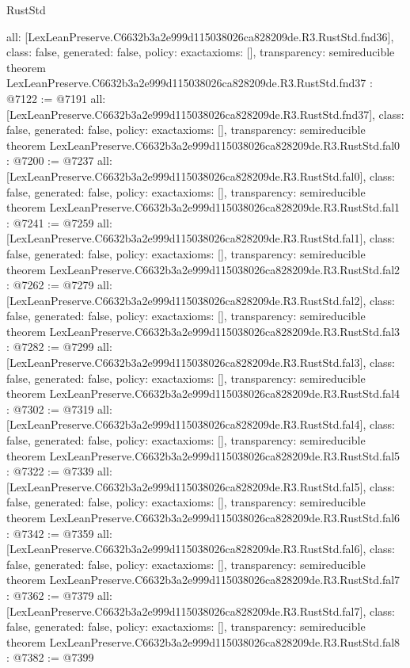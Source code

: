 \begin{lexlean}{RustStd}
\begin{coremodule}
{  all: [LexLeanPreserve.C6632b3a2e999d115038026ca828209de.R3.RustStd.fnd36],
  class: false,
  generated: false,
  policy: exact{axioms: []},
  transparency: semireducible
}
theorem LexLeanPreserve.C6632b3a2e999d115038026ca828209de.R3.RustStd.fnd37 : @7122 := @7191 {
  all: [LexLeanPreserve.C6632b3a2e999d115038026ca828209de.R3.RustStd.fnd37],
  class: false,
  generated: false,
  policy: exact{axioms: []},
  transparency: semireducible
}
theorem LexLeanPreserve.C6632b3a2e999d115038026ca828209de.R3.RustStd.fal0 : @7200 := @7237 {
  all: [LexLeanPreserve.C6632b3a2e999d115038026ca828209de.R3.RustStd.fal0],
  class: false,
  generated: false,
  policy: exact{axioms: []},
  transparency: semireducible
}
theorem LexLeanPreserve.C6632b3a2e999d115038026ca828209de.R3.RustStd.fal1 : @7241 := @7259 {
  all: [LexLeanPreserve.C6632b3a2e999d115038026ca828209de.R3.RustStd.fal1],
  class: false,
  generated: false,
  policy: exact{axioms: []},
  transparency: semireducible
}
theorem LexLeanPreserve.C6632b3a2e999d115038026ca828209de.R3.RustStd.fal2 : @7262 := @7279 {
  all: [LexLeanPreserve.C6632b3a2e999d115038026ca828209de.R3.RustStd.fal2],
  class: false,
  generated: false,
  policy: exact{axioms: []},
  transparency: semireducible
}
theorem LexLeanPreserve.C6632b3a2e999d115038026ca828209de.R3.RustStd.fal3 : @7282 := @7299 {
  all: [LexLeanPreserve.C6632b3a2e999d115038026ca828209de.R3.RustStd.fal3],
  class: false,
  generated: false,
  policy: exact{axioms: []},
  transparency: semireducible
}
theorem LexLeanPreserve.C6632b3a2e999d115038026ca828209de.R3.RustStd.fal4 : @7302 := @7319 {
  all: [LexLeanPreserve.C6632b3a2e999d115038026ca828209de.R3.RustStd.fal4],
  class: false,
  generated: false,
  policy: exact{axioms: []},
  transparency: semireducible
}
theorem LexLeanPreserve.C6632b3a2e999d115038026ca828209de.R3.RustStd.fal5 : @7322 := @7339 {
  all: [LexLeanPreserve.C6632b3a2e999d115038026ca828209de.R3.RustStd.fal5],
  class: false,
  generated: false,
  policy: exact{axioms: []},
  transparency: semireducible
}
theorem LexLeanPreserve.C6632b3a2e999d115038026ca828209de.R3.RustStd.fal6 : @7342 := @7359 {
  all: [LexLeanPreserve.C6632b3a2e999d115038026ca828209de.R3.RustStd.fal6],
  class: false,
  generated: false,
  policy: exact{axioms: []},
  transparency: semireducible
}
theorem LexLeanPreserve.C6632b3a2e999d115038026ca828209de.R3.RustStd.fal7 : @7362 := @7379 {
  all: [LexLeanPreserve.C6632b3a2e999d115038026ca828209de.R3.RustStd.fal7],
  class: false,
  generated: false,
  policy: exact{axioms: []},
  transparency: semireducible
}
theorem LexLeanPreserve.C6632b3a2e999d115038026ca828209de.R3.RustStd.fal8 : @7382 := @7399 {
}
\end{coremodule}
\end{lexlean}
